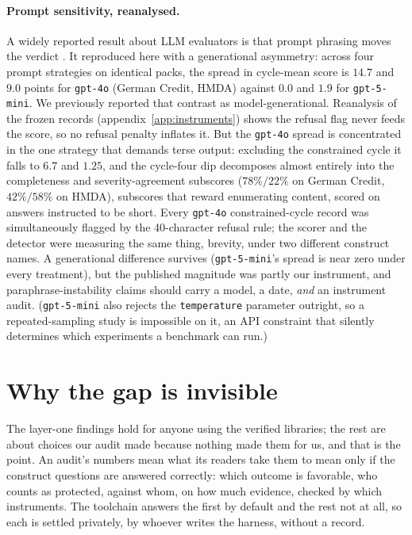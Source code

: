 \documentclass[sigconf,nonacm]{acmart}
\begin{document}
\paragraph{Prompt sensitivity, reanalysed.} A widely reported result about LLM
evaluators is that prompt phrasing moves the verdict \citep{sclar2024}. It
reproduced here with a generational asymmetry: across four prompt strategies
on identical packs, the spread in cycle-mean score is $14.7$ and $9.0$ points
for \texttt{gpt-4o} (German Credit, HMDA) against $0.0$ and $1.9$ for
\texttt{gpt-5-mini}. We previously reported that contrast as
model-generational. Reanalysis of the frozen records
(appendix~\ref{app:instruments}) shows the refusal flag never feeds the score,
so no refusal penalty inflates it. But the \texttt{gpt-4o} spread is
concentrated in the one strategy that demands terse output: excluding the
constrained cycle it falls to $6.7$ and $1.25$, and the cycle-four dip
decomposes almost entirely into the completeness and severity-agreement
subscores ($78\%/22\%$ on German Credit, $42\%/58\%$ on HMDA), subscores
that reward enumerating content, scored on answers instructed to be short.
Every \texttt{gpt-4o} constrained-cycle record was simultaneously flagged by
the 40-character refusal rule; the scorer and the detector were measuring the
same thing, brevity, under two different construct names. A generational
difference survives (\texttt{gpt-5-mini}'s spread is near zero under every
treatment), but the published magnitude was partly our instrument, and
paraphrase-instability claims should carry a model, a date, \emph{and} an
instrument audit. (\texttt{gpt-5-mini} also rejects the \texttt{temperature}
parameter outright, so a repeated-sampling study is impossible on it, an
API constraint that silently determines which experiments a benchmark can
run.)

\section{Why the gap is invisible}
\label{sec:invisible}

The layer-one findings hold for anyone using the verified libraries; the rest
are about choices our audit made because nothing made them for us, and that
is the point. An audit's numbers mean what its readers take them to mean only
if the construct questions are answered correctly: which outcome is favorable,
who counts as protected, against whom, on how much evidence, checked by which
instruments.
The toolchain answers the first by default and the rest not at all, so each is
settled privately, by whoever writes the harness, without a record.
\end{document}
